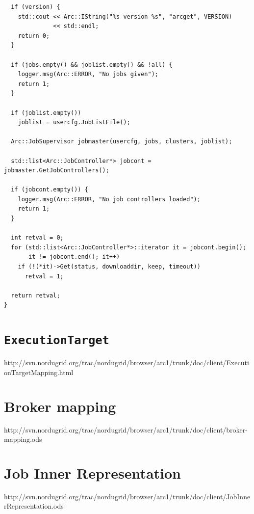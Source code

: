 \documentclass{book}
\newcommand{\ExecutionTarget}{\texttt{ExecutionTarget}}
\begin{document}
\begin{shaded}
\begin{verbatim}
  if (version) {
    std::cout << Arc::IString("%s version %s", "arcget", VERSION)
              << std::endl;
    return 0;
  }

  if (jobs.empty() && joblist.empty() && !all) {
    logger.msg(Arc::ERROR, "No jobs given");
    return 1;
  }

  if (joblist.empty())
    joblist = usercfg.JobListFile();

  Arc::JobSupervisor jobmaster(usercfg, jobs, clusters, joblist);

  std::list<Arc::JobController*> jobcont = jobmaster.GetJobControllers();

  if (jobcont.empty()) {
    logger.msg(Arc::ERROR, "No job controllers loaded");
    return 1;
  }

  int retval = 0;
  for (std::list<Arc::JobController*>::iterator it = jobcont.begin();
       it != jobcont.end(); it++)
    if (!(*it)->Get(status, downloaddir, keep, timeout))
      retval = 1;

  return retval;
}
\end{verbatim}
\end{shaded}

\appendix

\chapter{{\ExecutionTarget}}
\label{app:ExTarget}

http://svn.nordugrid.org/trac/nordugrid/browser/arc1/trunk/doc/client/ExecutionTargetMapping.html

\chapter{Broker mapping}
\label{app:broker-mapping}

http://svn.nordugrid.org/trac/nordugrid/browser/arc1/trunk/doc/client/broker-mapping.ods

\chapter{Job Inner Representation}
\label{app:jobinnerrepresentation}

http://svn.nordugrid.org/trac/nordugrid/browser/arc1/trunk/doc/client/JobInnerRepresentation.ods


\end{document}
